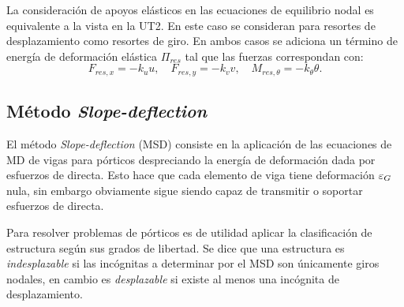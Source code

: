 La consideración de apoyos elásticos en las ecuaciones de equilibrio nodal es equivalente a la vista en la UT2. En este caso se consideran para resortes de desplazamiento como resortes de giro. En ambos casos se adiciona un término de energía de deformación elástica $\Pi_{res}$ tal que  las fuerzas correspondan con:
%
\begin{equation}
F_{res,x} = -k_u u , \quad
F_{res,y} = -k_v v, 
\quad 
M_{res,\theta} = -k_\theta \theta.
\end{equation}


\subsection{Método \textit{Slope-deflection}}

El método \textit{Slope-deflection} (MSD) consiste en la aplicación de las ecuaciones de MD de vigas para pórticos despreciando la energía de deformación dada por esfuerzos de directa. %
%
Esto hace que cada elemento de viga tiene deformación $\varepsilon_G$ nula, sin embargo obviamente sigue siendo capaz de transmitir o soportar esfuerzos de directa. %

Para resolver problemas de pórticos es de utilidad aplicar la clasificación de estructura según sus grados de libertad. Se dice que una estructura es \textit{indesplazable} si las incógnitas a determinar por el MSD son únicamente giros nodales, en cambio es \textit{desplazable} si existe al menos una incógnita de desplazamiento. %
%

